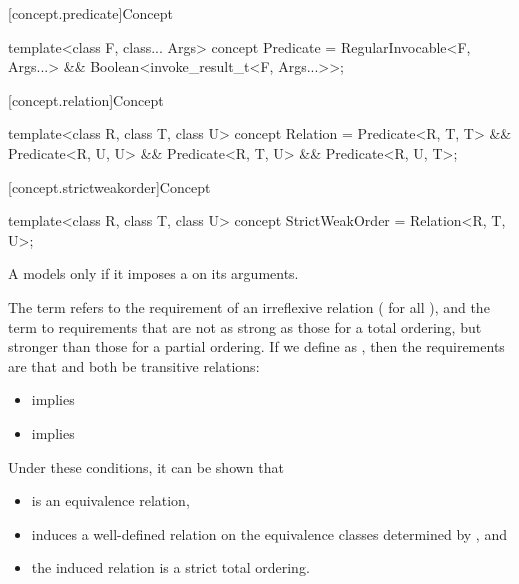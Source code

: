 [concept.predicate]{Concept }

%
\begin{itemdecl}
template<class F, class... Args>
  concept Predicate = RegularInvocable<F, Args...> && Boolean<invoke_result_t<F, Args...>>;
\end{itemdecl}

[concept.relation]{Concept }

%
\begin{itemdecl}
template<class R, class T, class U>
  concept Relation =
    Predicate<R, T, T> && Predicate<R, U, U> &&
    Predicate<R, T, U> && Predicate<R, U, T>;
\end{itemdecl}

[concept.strictweakorder]{Concept }

%
\begin{itemdecl}
template<class R, class T, class U>
  concept StrictWeakOrder = Relation<R, T, U>;
\end{itemdecl}

\begin{itemdescr}
\pnum
A  models  only if
it imposes a  on its arguments.

\pnum
The term
refers to the
requirement of an irreflexive relation ( for all ),
and the term
to requirements that are not as strong as
those for a total ordering,
but stronger than those for a partial
ordering.
If we define
as
,
then the requirements are that
and
both be transitive relations:

\begin{itemize}
\item
{}
implies
\item
{}
implies
\end{itemize}

\pnum
\begin{note}
Under these conditions, it can be shown that
\begin{itemize}
\item
{}
is an equivalence relation,
\item
{}
induces a well-defined relation on the equivalence
classes determined by
, and
\item
the induced relation is a strict total ordering.
\end{itemize}
\end{note}
\end{itemdescr}
